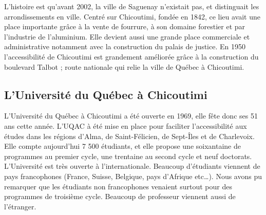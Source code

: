 L'histoire est qu'avant 2002, la ville de Saguenay n'existait pas, et distinguait les arrondissements en ville.
Centré sur Chicoutimi, fondée en 1842, ce lieu avait une place importante grâce à la vente de fourrure, à son domaine forestier et par l'industrie de l'aluminium. Elle devient aussi une grande place commerciale et administrative notamment avec la construction du palais de justice.
En 1950 l’accessibilité de Chicoutimi est grandement améliorée grâce à la construction du
boulevard Talbot ; route nationale qui relie la ville de Québec à Chicoutimi.


\subsection{L'Université du Québec à Chicoutimi}

L’Université du Québec à Chicoutimi a été ouverte en 1969, elle fête donc ses 51 ans cette année. L’UQAC à été mise en place pour faciliter l’accessibilité aux études dans les régions d’Alma, de Saint-Félicien, de Sept-Îles et de Charlevoix. Elle compte aujourd’hui 7 500 étudiants, et elle propose une soixantaine de programmes au premier cycle, une trentaine au second cycle et neuf doctorats.\\

L’Université est très ouverte à l’internationale. Beaucoup d’étudiants viennent de pays francophones (France, Suisse, Belgique, pays d'Afrique etc…). Nous avons pu remarquer que les étudiants non francophones venaient surtout pour des programmes de troisième cycle.
Beaucoup de professeur viennent aussi de l’étranger.\\

